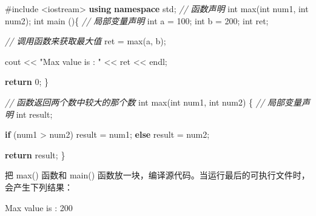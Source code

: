 \documentclass[
]{article}
\newenvironment{Shaded}{}{}
\newcommand{\CommentTok}[1]{\textcolor[rgb]{0.38,0.63,0.69}{\textit{#1}}}
\newcommand{\ControlFlowTok}[1]{\textcolor[rgb]{0.00,0.44,0.13}{\textbf{#1}}}
\newcommand{\DataTypeTok}[1]{\textcolor[rgb]{0.56,0.13,0.00}{#1}}
\newcommand{\DecValTok}[1]{\textcolor[rgb]{0.25,0.63,0.44}{#1}}
\newcommand{\ImportTok}[1]{#1}
\newcommand{\KeywordTok}[1]{\textcolor[rgb]{0.00,0.44,0.13}{\textbf{#1}}}
\newcommand{\NormalTok}[1]{#1}
\newcommand{\OperatorTok}[1]{\textcolor[rgb]{0.40,0.40,0.40}{#1}}
\newcommand{\PreprocessorTok}[1]{\textcolor[rgb]{0.74,0.48,0.00}{#1}}
\newcommand{\StringTok}[1]{\textcolor[rgb]{0.25,0.44,0.63}{#1}}
\begin{document}
\begin{Shaded}
\begin{Highlighting}[]
\PreprocessorTok{\#include }\ImportTok{\textless{}iostream\textgreater{}}
\KeywordTok{using} \KeywordTok{namespace}\NormalTok{ std}\OperatorTok{;}
\CommentTok{// 函数声明}
\DataTypeTok{int}\NormalTok{ max}\OperatorTok{(}\DataTypeTok{int}\NormalTok{ num1}\OperatorTok{,} \DataTypeTok{int}\NormalTok{ num2}\OperatorTok{);}
\DataTypeTok{int}\NormalTok{ main }\OperatorTok{()\{}
   \CommentTok{// 局部变量声明}
   \DataTypeTok{int}\NormalTok{ a }\OperatorTok{=} \DecValTok{100}\OperatorTok{;}
   \DataTypeTok{int}\NormalTok{ b }\OperatorTok{=} \DecValTok{200}\OperatorTok{;}
   \DataTypeTok{int}\NormalTok{ ret}\OperatorTok{;}
 
   \CommentTok{// 调用函数来获取最大值}
\NormalTok{   ret }\OperatorTok{=}\NormalTok{ max}\OperatorTok{(}\NormalTok{a}\OperatorTok{,}\NormalTok{ b}\OperatorTok{);}
 
\NormalTok{   cout }\OperatorTok{\textless{}\textless{}} \StringTok{"Max value is : "} \OperatorTok{\textless{}\textless{}}\NormalTok{ ret }\OperatorTok{\textless{}\textless{}}\NormalTok{ endl}\OperatorTok{;}
 
   \ControlFlowTok{return} \DecValTok{0}\OperatorTok{;}
\OperatorTok{\}}

\CommentTok{// 函数返回两个数中较大的那个数}
\DataTypeTok{int}\NormalTok{ max}\OperatorTok{(}\DataTypeTok{int}\NormalTok{ num1}\OperatorTok{,} \DataTypeTok{int}\NormalTok{ num2}\OperatorTok{)} \OperatorTok{\{}
   \CommentTok{// 局部变量声明}
   \DataTypeTok{int}\NormalTok{ result}\OperatorTok{;}
 
   \ControlFlowTok{if} \OperatorTok{(}\NormalTok{num1 }\OperatorTok{\textgreater{}}\NormalTok{ num2}\OperatorTok{)}
\NormalTok{      result }\OperatorTok{=}\NormalTok{ num1}\OperatorTok{;}
   \ControlFlowTok{else}
\NormalTok{      result }\OperatorTok{=}\NormalTok{ num2}\OperatorTok{;}
 
   \ControlFlowTok{return}\NormalTok{ result}\OperatorTok{;} 
\OperatorTok{\}}
\end{Highlighting}
\end{Shaded}

把 max() 函数和 main()
函数放一块，编译源代码。当运行最后的可执行文件时，会产生下列结果：

\begin{Shaded}
\begin{Highlighting}[]
\NormalTok{Max value is }\OperatorTok{:} \DecValTok{200}
\end{Highlighting}
\end{Shaded}
\end{document}
